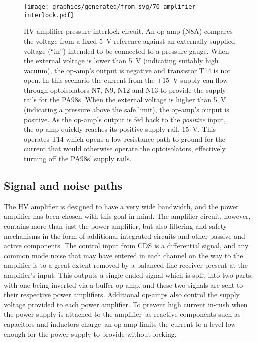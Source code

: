 
\begin{figure}
  \centering
  \texttt{[image: graphics/generated/from-svg/70-amplifier-interlock.pdf]}
  \caption{\gls{HV} amplifier pressure interlock circuit. An op-amp (N8A) compares the voltage from a fixed \SI{5}{\volt} reference against an externally supplied voltage (``in'') intended to be connected to a pressure gauge. When the external voltage is lower than \SI{5}{\volt} (indicating suitably high vacuum), the op-amp's output is negative and transistor T14 is not open. In this scenario the current from the +\SI{15}{\volt} supply can flow through optoisolators N7, N9, N12 and N13 to provide the supply rails for the PA98s. When the external voltage is higher than \SI{5}{\volt} (indicating a pressure above the safe limit), the op-amp's output is positive. As the op-amp's output is fed back to the \emph{positive} input, the op-amp quickly reaches its positive supply rail, \SI{15}{\volt}. This operates T14 which opens a low-resistance path to ground for the current that would otherwise operate the optoisolators, effectively turning off the PA98s' supply rails.}
  \label{fig:amplifier-interlock}
\end{figure}

\subsection{\label{sec:signal-and-noise-paths}Signal and noise paths}
The \gls{HV} amplifier is designed to have a very wide bandwidth, and the power amplifier has been chosen with this goal in mind. The amplifier circuit, however, contains more than just the power amplifier, but also filtering and safety mechanisms in the form of additional integrated circuits and other passive and active components. The control input from \gls{CDS} is a differential signal, and any common mode noise that may have entered in each channel on the way to the amplifier is to a great extent removed by a balanced line receiver present at the amplifier's input. This outputs a single-ended signal which is split into two parts, with one being inverted via a buffer op-amp, and these two signals are sent to their respective power amplifiers. Additional op-amps also control the supply voltage provided to each power amplifier. To prevent high current in-rush when the power supply is attached to the amplifier--as reactive components such as capacitors and inductors charge--an op-amp limits the current to a level low enough for the power supply to provide without locking.

